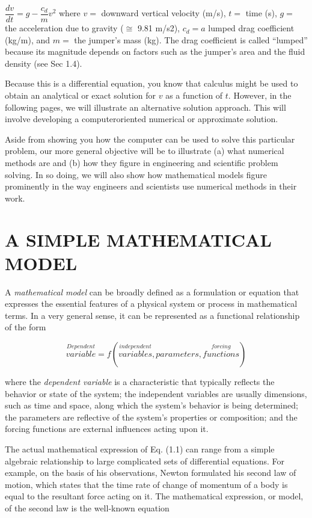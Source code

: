 \documentclass[../main.tex]{subfiles}
\begin{document}
$\dfrac{dv}{dt}=g-\dfrac{c_d}{m}v^2$
where $v =$ downward vertical velocity (m/s), $t =$ time (s), $g =$ the acceleration due to
gravity ($\cong$ 9.81 m/s2), $c_d = a$ lumped drag coefficient (kg/m), and $m =$ the jumper’s
mass (kg). The drag coefficient is called “lumped” because its magnitude depends on factors such as the jumper’s area and the fluid density (see Sec 1.4).


Because this is a differential equation, you know that calculus might be used to obtain
an analytical or exact solution for $v$ as a function of $t$. However, in the following pages, we
will illustrate an alternative solution approach. This will involve developing a computeroriented numerical or approximate solution.


Aside from showing you how the computer can be used to solve this particular problem, our more general objective will be to illustrate (a) what numerical methods are and
(b) how they figure in engineering and scientific problem solving. In so doing, we will also
show how mathematical models figure prominently in the way engineers and scientists use
numerical methods in their work.


\bigskip
\section{A SIMPLE MATHEMATICAL MODEL}
\label{sec:sec1}
  A \textsl{mathematical model} can be broadly defined as a formulation or equation that expresses
the essential features of a physical system or process in mathematical terms. In a very general sense, it can be represented as a functional relationship of the form


\begin{equation}
\tag{1.1}
\overset{Dependent}{variable} = f \left( \overset{independent}{variables},parameters,\overset{forcing}{functions}\right)  
\end{equation}
 
where the \textsl{dependent variable} is a characteristic that typically reflects the behavior or state
of the system; the independent variables are usually dimensions, such as time and space,
along which the system’s behavior is being determined; the parameters are reflective of the
system's properties or composition; and the forcing functions are external influences acting
upon it.

The actual mathematical expression of Eq. (1.1) can range from a simple algebraic
relationship to large complicated sets of differential equations. For example, on the basis of
his observations, Newton formulated his second law of motion, which states that the time
rate of change of momentum of a body is equal to the resultant force acting on it. The mathematical expression, or model, of the second law is the well-known equation
\end{document}
